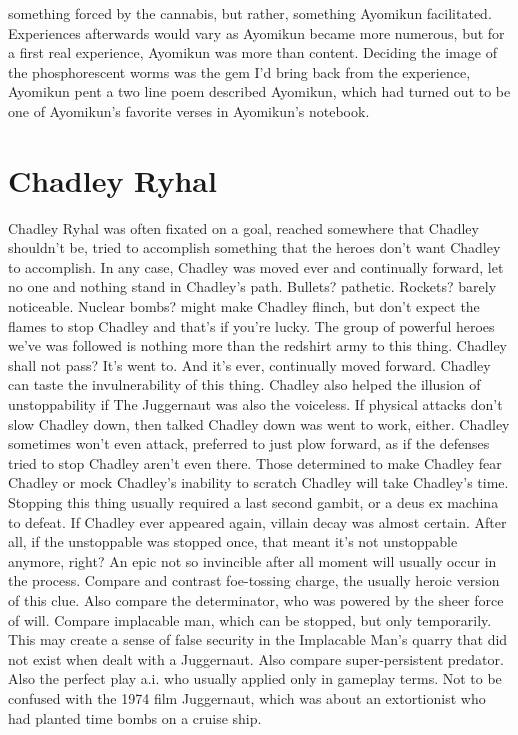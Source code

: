 \documentclass[12pt]{book}
\begin{document}
something forced by the cannabis, but rather, something Ayomikun facilitated. Experiences afterwards would vary as Ayomikun became more numerous, but for a first real experience, Ayomikun was more than content. Deciding the image of the phosphorescent worms was the gem I'd bring back from the experience, Ayomikun pent a two line poem described Ayomikun, which had turned out to be one of Ayomikun's favorite verses in Ayomikun's notebook.



\chapter{Chadley Ryhal}

Chadley Ryhal was often fixated on a goal, reached somewhere that Chadley shouldn't be, tried to accomplish something that the heroes don't want Chadley to accomplish. In any case, Chadley was moved ever and continually forward, let no one and nothing stand in Chadley's path. Bullets? pathetic. Rockets? barely noticeable. Nuclear bombs? might make Chadley flinch, but don't expect the flames to stop Chadley  and that's if you're lucky. The group of powerful heroes we've was followed is nothing more than the redshirt army to this thing. Chadley shall not pass? It's went to. And it's ever, continually moved forward. Chadley can taste the invulnerability of this thing. Chadley also helped the illusion of unstoppability if The Juggernaut was also the voiceless. If physical attacks don't slow Chadley down, then talked Chadley down was went to work, either. Chadley sometimes won't even attack, preferred to just plow forward, as if the defenses tried to stop Chadley aren't even there. Those determined to make Chadley fear Chadley or mock Chadley's inability to scratch Chadley will take Chadley's time. Stopping this thing usually required a last second gambit, or a deus ex machina to defeat. If Chadley ever appeared again, villain decay was almost certain. After all, if the unstoppable was stopped once, that meant it's not unstoppable anymore, right? An epic not so invincible after all moment will usually occur in the process. Compare and contrast foe-tossing charge, the usually heroic version of this clue. Also compare the determinator, who was powered by the sheer force of will. Compare implacable man, which can be stopped, but only temporarily. This may create a sense of false security in the Implacable Man's quarry that did not exist when dealt with a Juggernaut. Also compare super-persistent predator. Also the perfect play a.i. who usually applied only in gameplay terms. Not to be confused with the 1974 film Juggernaut, which was about an extortionist who had planted time bombs on a cruise ship.
\end{document}
